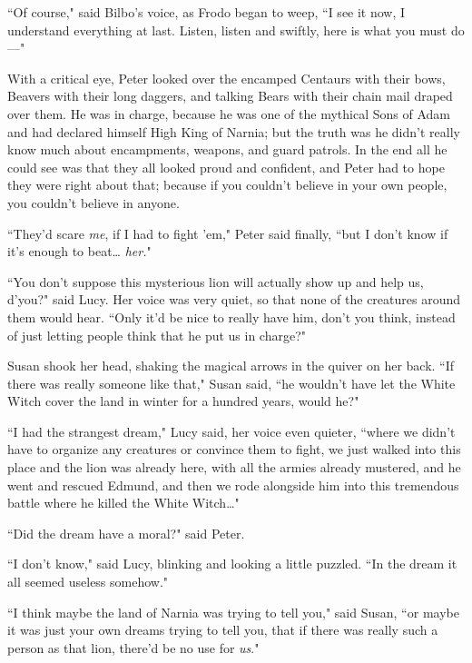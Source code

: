 ``Of course," said Bilbo's voice, as Frodo began to weep, ``I see it now, I understand everything at last. Listen, listen and swiftly, here is what you must do—"


With a critical eye, Peter looked over the encamped Centaurs with their bows, Beavers with their long daggers, and talking Bears with their chain mail draped over them. He was in charge, because he was one of the mythical Sons of Adam and had declared himself High King of Narnia; but the truth was he didn't really know much about encampments, weapons, and guard patrols. In the end all he could see was that they all looked proud and confident, and Peter had to hope they were right about that; because if you couldn't believe in your own people, you couldn't believe in anyone.

``They'd scare \emph{me}, if I had to fight 'em," Peter said finally, ``but I don't know if it's enough to beat{\ldots} \emph{her.}"

``You don't suppose this mysterious lion will actually show up and help us, d'you?" said Lucy. Her voice was very quiet, so that none of the creatures around them would hear. ``Only it'd be nice to really have him, don't you think, instead of just letting people think that he put us in charge?"

Susan shook her head, shaking the magical arrows in the quiver on her back. ``If there was really someone like that," Susan said, ``he wouldn't have let the White Witch cover the land in winter for a hundred years, would he?"

``I had the strangest dream," Lucy said, her voice even quieter, ``where we didn't have to organize any creatures or convince them to fight, we just walked into this place and the lion was already here, with all the armies already mustered, and he went and rescued Edmund, and then we rode alongside him into this tremendous battle where he killed the White Witch{\ldots}"

``Did the dream have a moral?" said Peter.

``I don't know," said Lucy, blinking and looking a little puzzled. ``In the dream it all seemed useless somehow."

``I think maybe the land of Narnia was trying to tell you," said Susan, ``or maybe it was just your own dreams trying to tell you, that if there was really such a person as that lion, there'd be no use for \emph{us}."

